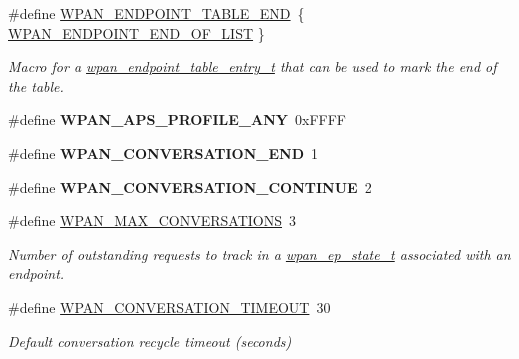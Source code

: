 \begin{DoxyCompactItemize}
\#define \hyperlink{group__wpan__aps_gaac571cafa96f8201c714feb0634afa92}{W\+P\+A\+N\+\_\+\+E\+N\+D\+P\+O\+I\+N\+T\+\_\+\+T\+A\+B\+L\+E\+\_\+\+E\+ND}~\{ \hyperlink{group__wpan__aps_ga0ca55f0e8039df7fba03c041e4cf5a79}{W\+P\+A\+N\+\_\+\+E\+N\+D\+P\+O\+I\+N\+T\+\_\+\+E\+N\+D\+\_\+\+O\+F\+\_\+\+L\+I\+ST} \}
\begin{DoxyCompactList}\small\item\em Macro for a \hyperlink{structwpan__endpoint__table__entry__t}{wpan\+\_\+endpoint\+\_\+table\+\_\+entry\+\_\+t} that can be used to mark the end of the table. \end{DoxyCompactList}\item 
\mbox{\label{group__wpan__aps_ga05c007913497e9a6286b7b2cdcb3f37f}} 
\#define {\bfseries W\+P\+A\+N\+\_\+\+A\+P\+S\+\_\+\+P\+R\+O\+F\+I\+L\+E\+\_\+\+A\+NY}~0x\+F\+F\+FF
\item 
\mbox{\label{group__wpan__aps_ga7f0128cee60f97e9f07bc95df3a0a1f1}} 
\#define {\bfseries W\+P\+A\+N\+\_\+\+C\+O\+N\+V\+E\+R\+S\+A\+T\+I\+O\+N\+\_\+\+E\+ND}~1
\item 
\mbox{\label{group__wpan__aps_gaef235cbd4d3160abe5f856d86ad70555}} 
\#define {\bfseries W\+P\+A\+N\+\_\+\+C\+O\+N\+V\+E\+R\+S\+A\+T\+I\+O\+N\+\_\+\+C\+O\+N\+T\+I\+N\+UE}~2
\item 
\#define \hyperlink{group__wpan__aps_gae34b1efc8ba99add17fcd767852197d4}{W\+P\+A\+N\+\_\+\+M\+A\+X\+\_\+\+C\+O\+N\+V\+E\+R\+S\+A\+T\+I\+O\+NS}~3
\begin{DoxyCompactList}\small\item\em Number of outstanding requests to track in a \hyperlink{structwpan__ep__state__t}{wpan\+\_\+ep\+\_\+state\+\_\+t} associated with an endpoint. \end{DoxyCompactList}\item 
\mbox{\label{group__wpan__aps_gaaa330f432d7a6bccdb393a656ddfe4d3}} 
\#define \hyperlink{group__wpan__aps_gaaa330f432d7a6bccdb393a656ddfe4d3}{W\+P\+A\+N\+\_\+\+C\+O\+N\+V\+E\+R\+S\+A\+T\+I\+O\+N\+\_\+\+T\+I\+M\+E\+O\+UT}~30
\begin{DoxyCompactList}\small\item\em Default conversation recycle timeout (seconds) \end{DoxyCompactList}\end{DoxyCompactItemize}
